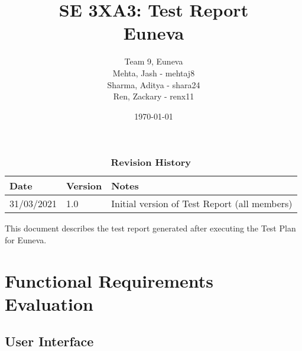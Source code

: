 \documentclass[12pt, titlepage]{article}
\title{SE 3XA3: Test Report\\Euneva}
\author{Team 9, Euneva
		\\ Mehta, Jash - mehtaj8
		\\ Sharma, Aditya - shara24
		\\ Ren, Zackary - renx11
}
\date{\today}
\begin{document}
\maketitle

\tableofcontents
\listoftables
\listoffigures

\begin{table}[bp]
\caption{\bf Revision History}
\begin{tabularx}{\textwidth}{p{3cm}p{2cm}X}
\toprule {\bf Date} & {\bf Version} & {\bf Notes}\\
\midrule
31/03/2021 & 1.0 & Initial version of Test Report (all members)\\
\bottomrule
\end{tabularx}
\end{table}

\newpage


This document describes the test report generated after executing the Test Plan for Euneva. 

\section{Functional Requirements Evaluation}

\subsection{User Interface}
\end{document}

